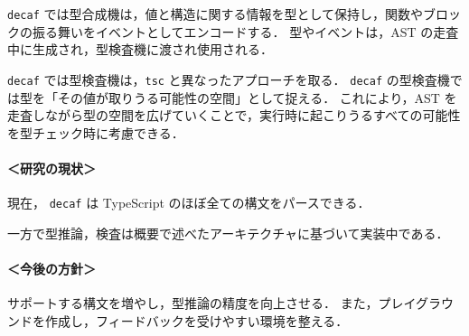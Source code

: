 \documentclass[dvipdfmx]{classes/tyukan}
\begin{document}
\texttt{decaf} では型合成機は，値と構造に関する情報を型として保持し，関数やブロックの振る舞いをイベントとしてエンコードする．
型やイベントは，AST の走査中に生成され，型検査機に渡され使用される．

\texttt{decaf} では型検査機は，\texttt{tsc} と異なったアプローチを取る．
\texttt{decaf} の型検査機では型を「その値が取りうる可能性の空間」として捉える．
これにより，AST を走査しながら型の空間を広げていくことで，実行時に起こりうるすべての可能性を型チェック時に考慮できる．

\paragraph{＜研究の現状＞}
現在， \texttt{decaf} は TypeScript のほぼ全ての構文をパースできる．

一方で型推論，検査は概要で述べたアーキテクチャに基づいて実装中である．

\paragraph{＜今後の方針＞}
サポートする構文を増やし，型推論の精度を向上させる．
また，プレイグラウンドを作成し，フィードバックを受けやすい環境を整える．
\end{document}
